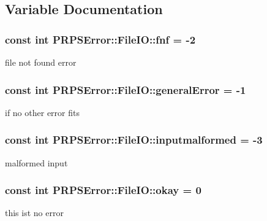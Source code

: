 \subsection{\-Variable \-Documentation}
\hypertarget{namespace_p_r_p_s_error_1_1_file_i_o_a0fa189c7ae0fb399e588ab8540d0d36c}{
\subsubsection[{fnf}]{\setlength{\rightskip}{0pt plus 5cm}const int {\bf \-P\-R\-P\-S\-Error\-::\-File\-I\-O\-::fnf} = -\/2}}\label{namespace_p_r_p_s_error_1_1_file_i_o_a0fa189c7ae0fb399e588ab8540d0d36c}
file not found error \hypertarget{namespace_p_r_p_s_error_1_1_file_i_o_a658d8bf148faadc2f0fcc679b7a601ed}{
\subsubsection[{general\-Error}]{\setlength{\rightskip}{0pt plus 5cm}const int {\bf \-P\-R\-P\-S\-Error\-::\-File\-I\-O\-::general\-Error} = -\/1}}\label{namespace_p_r_p_s_error_1_1_file_i_o_a658d8bf148faadc2f0fcc679b7a601ed}
if no other error fits \hypertarget{namespace_p_r_p_s_error_1_1_file_i_o_a6aef97ba368bc86d96cb6be41d0766e2}{
\subsubsection[{inputmalformed}]{\setlength{\rightskip}{0pt plus 5cm}const int {\bf \-P\-R\-P\-S\-Error\-::\-File\-I\-O\-::inputmalformed} = -\/3}}\label{namespace_p_r_p_s_error_1_1_file_i_o_a6aef97ba368bc86d96cb6be41d0766e2}
malformed input \hypertarget{namespace_p_r_p_s_error_1_1_file_i_o_a830919fa2b755d9e856ed4e1c514bf8e}{
\subsubsection[{okay}]{\setlength{\rightskip}{0pt plus 5cm}const int {\bf \-P\-R\-P\-S\-Error\-::\-File\-I\-O\-::okay} = 0}}\label{namespace_p_r_p_s_error_1_1_file_i_o_a830919fa2b755d9e856ed4e1c514bf8e}
this ist no error 